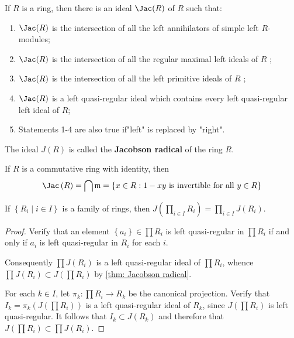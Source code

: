 \begin{theorem}
    \label{thm: Jacobson radical}
    If $R$ is a ring, then there is an ideal $\Jac(R)$ of $R$ such that:
    \begin{enumerate}
        \item
              $\Jac(R)$ is the intersection of all the left annihilators of simple left $R$-modules;

        \item
              $\Jac(R)$ is the intersection of all the regular maximal left ideals of $R$ ;

        \item
              $\Jac(R)$ is the intersection of all the left primitive ideals of $R$ ;

        \item
              $\Jac(R)$ is a left quasi-regular ideal which contains every left quasi-regular left ideal of $R$;

        \item
              Statements 1-4 are also true if"left" is replaced by "right".
    \end{enumerate}
    The ideal $J(R)$ is called the \textbf{Jacobson radical} of the ring $R$.
\end{theorem}

\begin{corollary}
    \label{cor: Jacobson radical in commutative unitary ring}
    If $R$ is a commutative ring with identity, then
    \begin{equation*}
        \Jac\left(R\right)
        =
        \bigcap \mathfrak{m}
        =
        \left\{x\in R :1-xy \text{ is invertible for all } y\in R\right\}
    \end{equation*}
\end{corollary}


\begin{theorem}
    If $\left\{R_{i} \mid i \in I\right\}$ is a family of rings, then $J\left(\prod_{i \in I} R_i\right)=\prod_{i \in I} J\left(R_i\right)$.

    \begin{proof}
        Verify that an element $\left\{a_i\right\} \in \prod R_i$ is left quasi-regular in $\prod R_i$ if and only if $a_i$ is left quasi-regular in $R_i$ for each $i$.

        Consequently $\prod J\left(R_i\right)$ is a left quasi-regular ideal of $\prod R_i$, whence $\prod J\left(R_i\right) \subset J\left(\prod R_i\right)$ by \ref{thm: Jacobson radical}.

        For each $k \in I$, let $\pi_k: \prod R_i \rightarrow R_k$ be the canonical projection. Verify that $I_k=\pi_k\left(J\left(\prod R_i\right)\right)$ is a left quasi-regular ideal of $R_k$, since $J\left(\prod R_i\right)$ is left quasi-regular. It follows that $I_k \subset J\left(R_k\right)$ and therefore that $J\left(\prod R_i\right) \subset \prod J\left(R_i\right)$.
    \end{proof}
\end{theorem}

